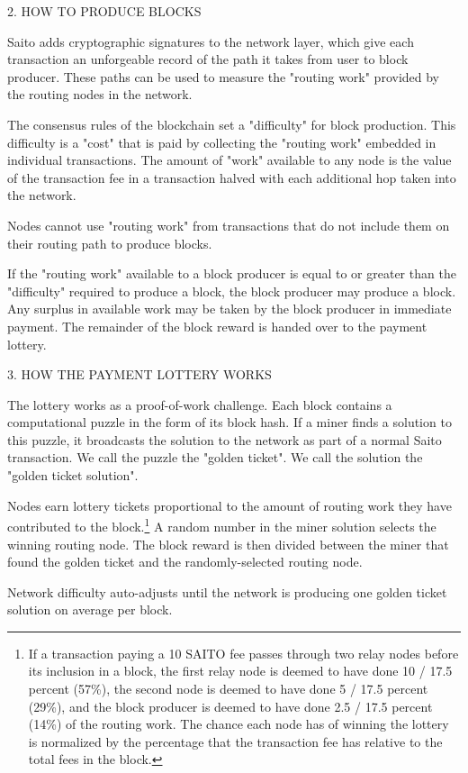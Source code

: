 \documentclass[11.5pt, oneside]{article}   	%
\begin{document}
\begin{multicols}{2}
2. HOW TO PRODUCE BLOCKS

Saito adds cryptographic signatures to the network layer, which give each transaction an unforgeable record of the path it takes from user to block producer. These paths can be used to measure the "routing work" provided by the routing nodes in the network.

The consensus rules of the blockchain set a "difficulty" for block production. This difficulty is a "cost" that is paid by collecting the  "routing work" embedded in individual transactions. The amount of "work" available to any node is the value of the transaction fee in a transaction halved with each additional hop taken into the network.

Nodes cannot use "routing work" from transactions that do not include them on their routing path to produce blocks.

If the "routing work" available to a block producer is equal to or greater than the "difficulty" required to produce a block, the block producer may produce a block. Any surplus in available work may be taken by the block producer in immediate payment. The remainder of the block reward is handed over to the payment lottery.


3. HOW THE PAYMENT LOTTERY WORKS

The lottery works as a proof-of-work challenge. Each block contains a computational puzzle in the form of its block hash. If a miner finds a solution to this puzzle, it broadcasts the solution to the network as part of a normal Saito transaction. We call the puzzle the "golden ticket". We call the solution the "golden ticket solution". 

Nodes earn lottery tickets proportional to the amount of routing work they have contributed to the block.\footnote[1]{If a transaction paying a 10 SAITO fee passes through two relay nodes before its inclusion in a block, the first relay node is deemed to have done 10 / 17.5 percent (57\%), the second node is deemed to have done 5 / 17.5 percent (29\%), and the block producer is deemed to have done 2.5 / 17.5 percent (14\%) of the routing work. The chance each node has of winning the lottery is normalized by the percentage that the transaction fee has relative to the total fees in the block.} A random number in the miner solution selects the winning routing node. The block reward is then divided between the miner that found the golden ticket and the randomly-selected routing node.

Network difficulty auto-adjusts until the network is producing one golden ticket solution on average per block.


\end{multicols}
\end{document}
